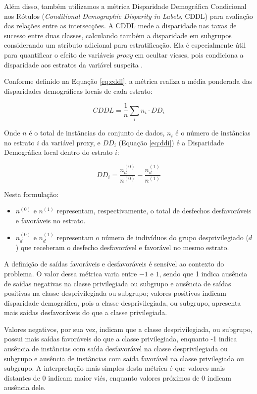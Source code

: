 Além disso, também utilizamos a métrica Disparidade Demográfica Condicional nos Rótulos (\textit{Conditional Demographic Disparity in Labels}, CDDL) para avaliação das relações entre as intersecções. A CDDL mede a disparidade nas taxas de sucesso entre duas classes, calculando também a disparidade em subgrupos considerando um atributo adicional para estratificação. Ela é especialmente útil para quantificar o efeito de variáveis \textit{proxy} em ocultar vieses, pois condiciona a disparidade aos estratos da variável suspeita \cite{hardt2021sagemaker}.

Conforme definido na Equação \ref{eq:cddl}, a métrica realiza a média ponderada das disparidades demográficas locais de cada estrato:

\begin{equation}
    CDDL = \frac{1}{n} \sum_{i} n_i \cdot DD_i
    \label{eq:cddl}
\end{equation}

\noindent Onde $n$ é o total de instâncias do conjunto de dados, $n_i$ é o número de instâncias no estrato $i$ da variável proxy, e $DD_i$ (Equação \ref{eq:ddi}) é a Disparidade Demográfica local dentro do estrato $i$:

\begin{equation}
    DD_i = \frac{n_d^{(0)}}{n^{(0)}} - \frac{n_d^{(1)}}{n^{(1)}}
    \label{eq:ddi}
\end{equation}

\noindent Nesta formulação:
\begin{itemize}
    \item $n^{(0)}$ e $n^{(1)}$ representam, respectivamente, o total de desfechos desfavoráveis e favoráveis no estrato.
    \item $n_d^{(0)}$ e $n_d^{(1)}$ representam o número de indivíduos do grupo desprivilegiado ($d$) que receberam o desfecho desfavorável e favorável no mesmo estrato.
\end{itemize}

A definição de saídas favoráveis e desfavoráveis é sensível ao contexto do problema. O valor dessa métrica varia entre $-1$ e $1$, sendo que 1 indica ausência de saídas negativas na classe privilegiada ou subgrupo e ausência de saídas positivas na classe desprivilegiada ou subgrupo; valores positivos indicam disparidade demográfica, pois a classe desprivilegiada, ou subgrupo, apresenta mais saídas desfavoráveis do que a classe privilegiada.

Valores negativos, por sua vez, indicam que a classe desprivilegiada, ou subgrupo, possui mais saídas favoráveis do que a classe privilegiada, enquanto -1 indica ausência de instâncias com saída desfavorável na classe desprivilegiada ou subgrupo e ausência de instâncias com saída favorável na classe privilegiada ou subgrupo. A interpretação mais simples desta métrica é que valores mais distantes de 0 indicam maior viés, enquanto valores próximos de 0 indicam ausência dele.

